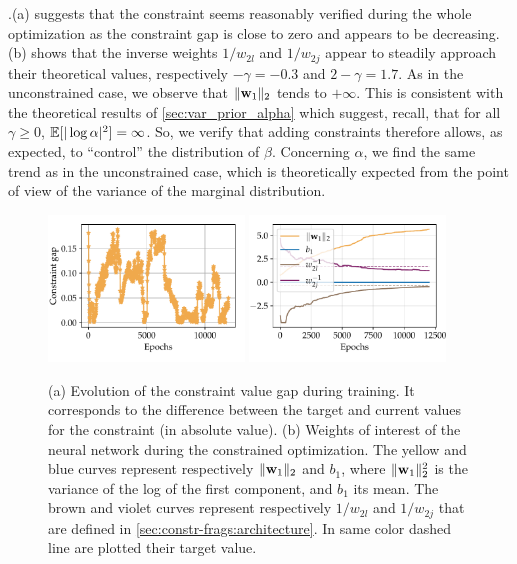.(a) suggests that the constraint seems reasonably verified during the whole optimization as the constraint gap is close to zero and appears to be decreasing. (b) shows that the inverse weights $1/w_{2l}$ and $1/w_{2j}$ appear to steadily approach their theoretical values, respectively $-\gamma=-0.3$ and $2-\gamma = 1.7$. As in the unconstrained case, we observe that $\|\mathbf{w}_1\|_2$ tends to $+\infty$. This is consistent with the theoretical results of \cref{sec:var_prior_alpha} which suggest, recall, that for all $\gamma\geq0$, $\mathbb{E}[|\log\alpha|^2]=\infty$. So, we verify that adding constraints therefore allows, as expected, to ``control'' the distribution of $\beta$. Concerning $\alpha$, we find the same trend as in the unconstrained case, which is theoretically expected from the point of view of the variance of the marginal distribution.


\begin{figure}[h]
    \centering
    {\includegraphics[width=5.2cm]{figures/constr-frags/constraint gap.pdf}}
    {\includegraphics[width=5.2cm]{figures/constr-frags/weights_constr.pdf}}
  \caption{(a) Evolution of the constraint value gap during training. It corresponds to the difference between the target and current values for the constraint (in absolute value). (b) Weights of interest of the neural network during the constrained optimization. The yellow and blue curves represent respectively $\|\mathbf{w}_1 \|_2$ and $b_1$, where $\|\mathbf{w}_1 \|_2^2$ is the variance of the log of the first component, and $b_1$ its mean. The brown and violet curves represent respectively $1/w_{2l}$ and $1/w_{2j}$ that are defined in \cref{sec:constr-frags:architecture}. In same color dashed line are plotted their target value.\label{fig:constr-frags:training-constr}}
\end{figure}

